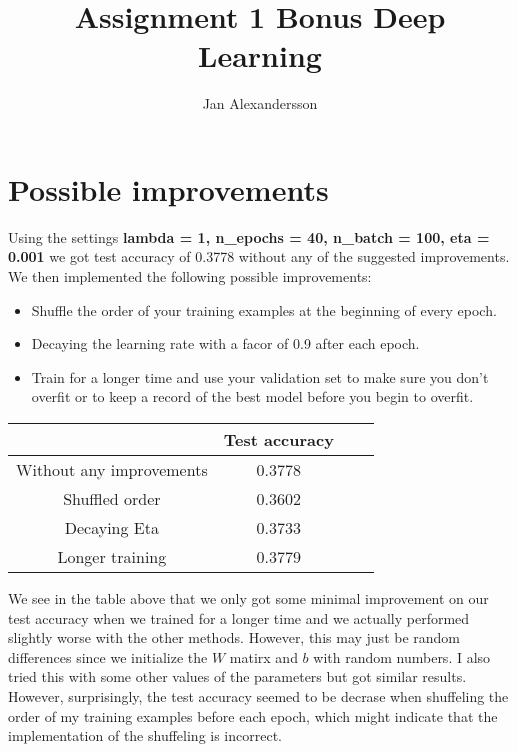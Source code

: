\documentclass{article}
\begin{document}
\title{Assignment 1 Bonus Deep Learning}
\author{Jan Alexandersson}
\maketitle 


\section{Possible improvements}

Using the settings \textbf{lambda = 1, n\_epochs = 40, n\_batch = 100, eta = 0.001} we got test accuracy of 0.3778 
without any of the suggested improvements. We then implemented the following possible improvements:

\begin{itemize}
 \item Shuffle the order of your training examples at the beginning of every epoch.
 \item Decaying the learning rate with a facor of 0.9 after each epoch.
 \item Train for a longer time and use your validation set to make sure you don’t overfit or to keep a record of the best model before you begin to overfit.
\end{itemize}

\begin{center}
\begin{tabular}{ |c|c|c|c| } 
\hline
  & Test accuracy \\
\hline
Without any improvements & 0.3778  \\
\hline
Shuffled order & 0.3602  \\ 
\hline
Decaying Eta & 0.3733  \\ 
\hline
Longer training & 0.3779  \\ 
\hline
\end{tabular}
\end{center}

We see in the table above that we only got some minimal improvement on our test accuracy when we trained for a longer time 
and we actually performed slightly worse with the other methods. However, this may just be random differences since we initialize 
the $W$ matirx and $b$ with random numbers. I also tried this with some other values of the parameters but got similar results. 
However, surprisingly, the test accuracy seemed to be decrase when shuffeling the order of my 
training examples before each epoch, which might indicate that the implementation of the shuffeling is incorrect. 
\end{document}
